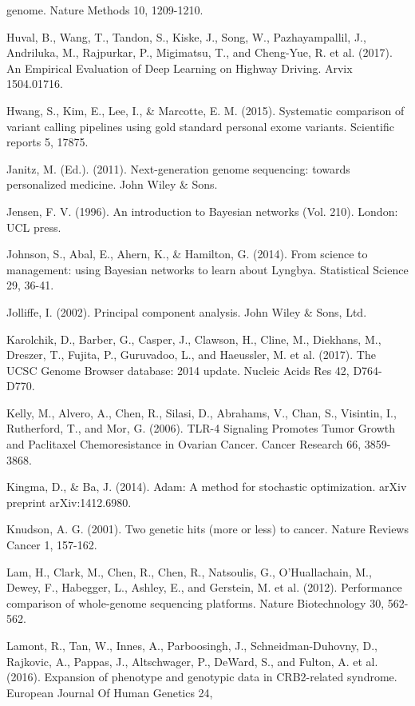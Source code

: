 \documentclass{article}
\begin{document}
\begin{list}{}{%
\setlength{\topsep}{0pt}%
\setlength{\leftmargin}{0.5in}%
\setlength{\listparindent}{-0.5in}%
\setlength{\itemindent}{-0.5in}%
\setlength{\parsep}{\parskip}%
}
genome. Nature Methods 10, 1209-1210.\\\item[] Huval, B., Wang, T., Tandon, S., Kiske, J., Song, W., Pazhayampallil, J., Andriluka, M., Rajpurkar, P., Migimatsu, T., and Cheng-Yue, R. et al. (2017). An Empirical Evaluation of Deep Learning on Highway Driving. Arvix 1504.01716.\\\item[] Hwang, S., Kim, E., Lee, I., \& Marcotte, E. M. (2015). Systematic comparison of variant calling pipelines using gold standard personal exome variants. Scientific reports 5, 17875.\\\item[] Janitz, M. (Ed.). (2011). Next-generation genome sequencing: towards personalized medicine. John Wiley \& Sons.\\\item[] Jensen, F. V. (1996). An introduction to Bayesian networks (Vol. 210). London: UCL press.\\\item[] Johnson, S., Abal, E., Ahern, K., \& Hamilton, G. (2014). From science to management: using Bayesian networks to learn about Lyngbya. Statistical Science 29, 36-41.\\\item[] Jolliffe, I. (2002). Principal component analysis. John Wiley \& Sons, Ltd.\\\item[] Karolchik, D., Barber, G., Casper, J., Clawson, H., Cline, M., Diekhans, M., Dreszer, T., Fujita, P., Guruvadoo, L., and Haeussler, M. et al. (2017). The UCSC Genome Browser database: 2014 update. Nucleic Acids Res 42, D764-D770.\\\item[] Kelly, M., Alvero, A., Chen, R., Silasi, D., Abrahams, V., Chan, S., Visintin, I., Rutherford, T., and Mor, G. (2006). TLR-4 Signaling Promotes Tumor Growth and Paclitaxel Chemoresistance in Ovarian Cancer. Cancer Research 66, 3859-3868.\\\item[] Kingma, D., \& Ba, J. (2014). Adam: A method for stochastic optimization. arXiv preprint arXiv:1412.6980.\\\item[] Knudson, A. G. (2001). Two genetic hits (more or less) to cancer. Nature Reviews Cancer 1, 157-162.\\\item[] Lam, H., Clark, M., Chen, R., Chen, R., Natsoulis, G., O'Huallachain, M., Dewey, F., Habegger, L., Ashley, E., and Gerstein, M. et al. (2012). Performance comparison of whole-genome sequencing platforms. Nature Biotechnology 30, 562-562.\\\item[] Lamont, R., Tan, W., Innes, A., Parboosingh, J., Schneidman-Duhovny, D., Rajkovic, A., Pappas, J., Altschwager, P., DeWard, S., and Fulton, A. et al. (2016). Expansion of phenotype and genotypic data in CRB2-related syndrome. European Journal Of Human Genetics 24, 
\end{list}
\end{document}
